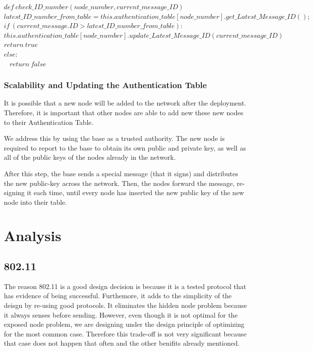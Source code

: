 \documentclass[letterpaper]{article}
\begin{document}
$def \ check\_ID\_number(node\_number, current\_message\_ID)$ \\
\hspace*{10 mm} $latest\_ID\_number\_from\_table = this.authentication\_table[node\_number].get\_Latest\_Message\_ID();$
\hspace*{10 mm} $if \ (current\_message.ID > latest\_ID\_number\_from\_table):$\\
\hspace*{20 mm} $this.authentication\_table[node\_number].update\_Latest\_Message\_ID(current\_message\_ID)$\\
\hspace*{20 mm} $return \ true$ \\
\hspace*{10 mm} $else:$\\ \ 
\hspace*{20 mm} $return \ false$\\


\subsubsection{Scalability and Updating the Authentication Table}

It is possible that a new node will be added to the network after the deployment. 
Therefore, it is important that other nodes are able to add new these new nodes to their Authentication Table.

We address this by using the base as a trusted authority.
The new node is required to report to the base to obtain its own public and private key, as well as all of the public keys of the nodes already in the network.

After this step, the base sends a special message (that it signs) and distributes the new public-key across the network. 
Then, the nodes forward the message, re-signing it each time, until every node has inserted the new public key of the new node into their table.

\section{Analysis}

\subsection{802.11}
The reason 802.11 is a good design decision is because it is a tested protocol that has evidence of being successful. Furthemore, it adds to the simplicity of the deisgn by re-using good protocols. It eliminates the hidden node problem because it always senses before sending. However, even though it is not optimal for the exposed node problem, we are designing under the design principle of optimizing for the most common case. Therefore this trade-off is not very significant because that case does not happen that often and the other benifits already mentioned.
\end{document}
